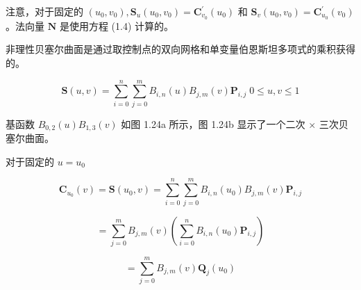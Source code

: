\documentclass[../main.tex]{subfiles}
\begin{document}
注意，对于固定的 \(\left( {{u}_{0},{v}_{0}}\right) ,{\mathbf{S}}_{u}\left( {{u}_{0},{v}_{0}}\right)  = {\mathbf{C}}_{{v}_{0}}^{\prime }\left( {u}_{0}\right)\) 和 \({\mathbf{S}}_{v}\left( {{u}_{0},{v}_{0}}\right)  = {\mathbf{C}}_{{u}_{0}}^{\prime }\left( {v}_{0}\right)\) 。法向量 \(\mathbf{N}\) 是使用方程 (1.4) 计算的。

非理性贝塞尔曲面是通过取控制点的双向网格和单变量伯恩斯坦多项式的乘积获得的。

\[
\mathbf{S}\left( {u,v}\right)  = \mathop{\sum }\limits_{{i = 0}}^{n}\mathop{\sum }\limits_{{j = 0}}^{m}{B}_{i,n}\left( u\right) {B}_{j,m}\left( v\right) {\mathbf{P}}_{i,j}\;0 \leq  u,v \leq  1 \tag{1.23}
\]

\noindent\begin{minipage}{\linewidth}
基函数 \({B}_{0,2}\left( u\right) {B}_{1,3}\left( v\right)\) 如图 1.24a 所示，图 1.24b 显示了一个二次 \(\times\) 三次贝塞尔曲面。
\begin{center}
\begin{minipage}{24.6cm}
\centering
\begin{minipage}[t]{12cm}\centering
{}
\end{minipage}\hspace{.6cm}%
\begin{minipage}[t]{12cm}\centering
{}
\end{minipage}
\captionsetup{font=small,skip=6pt,justification=centering}
\end{minipage}
\end{center}
\end{minipage}
\par\medskip

对于固定的 \(u = {u}_{0}\)

\[
{\mathbf{C}}_{{u}_{0}}\left( v\right)  = \mathbf{S}\left( {{u}_{0},v}\right)  = \mathop{\sum }\limits_{{i = 0}}^{n}\mathop{\sum }\limits_{{j = 0}}^{m}{B}_{i,n}\left( {u}_{0}\right) {B}_{j,m}\left( v\right) {\mathbf{P}}_{i,j}
\]

\[
= \mathop{\sum }\limits_{{j = 0}}^{m}{B}_{j,m}\left( v\right) \left( {\mathop{\sum }\limits_{{i = 0}}^{n}{B}_{i,n}\left( {u}_{0}\right) {\mathbf{P}}_{i,j}}\right)
\]

\[
= \mathop{\sum }\limits_{{j = 0}}^{m}{B}_{j,m}\left( v\right) {\mathbf{Q}}_{j}\left( {u}_{0}\right)  \tag{1.24}
\]
\end{document}
